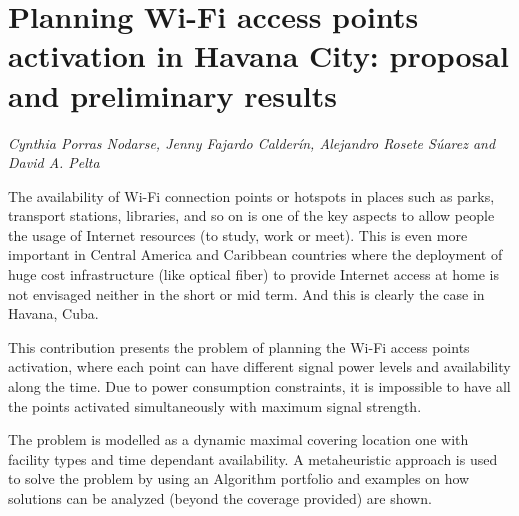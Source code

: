 \documentclass[../booklet.tex]{subfiles}
\begin{document}
\section[Planning Wi-Fi access points activation in Havana City: proposal and preliminary results. {\it Cynthia Porras Nodarse, Jenny Fajardo Calderín, Alejandro Rosete Súarez and David A. Pelta}]{Planning Wi-Fi access points activation in Havana City: proposal and preliminary results}
   

\begin{center}
  {\it Cynthia Porras Nodarse, Jenny Fajardo Calderín, Alejandro Rosete Súarez and David A. Pelta}
\end{center}

\vskip 0.8cm


The availability of Wi-Fi connection points or hotspots in places such as parks, transport stations, libraries, and so on is one of the key aspects to allow people the usage of Internet resources (to study, work or meet).
This is even more important in Central America and Caribbean countries where the deployment of huge cost infrastructure (like optical fiber) to provide Internet access at home is not envisaged neither in the short or mid term. And this is clearly the case in Havana, Cuba. 

This contribution presents the problem of planning the Wi-Fi access points activation, where each point can have different signal power levels and availability along the time. Due to power consumption constraints, it is impossible to have all the points activated simultaneously with maximum signal strength.

The problem is modelled as a dynamic maximal covering location one with facility types and time dependant availability. A metaheuristic approach is used to solve the problem by using an Algorithm portfolio and examples on how solutions can be analyzed (beyond the coverage provided)  are shown.

\end{document}
